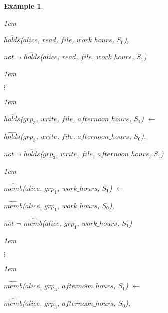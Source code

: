\documentclass[11pt]{report}
\newtheorem{vexample}{Example}[chapter]
\newenvironment{vquote}
{
  \begin{list}{}{\leftmargin 1em}\item[]
}
{
  \end{list}
}
\begin{document}
\begin{vexample}
\begin{enumerate}
\begin{vquote}
                \hspace{1em}
                $\hat{holds}$($alice$, $read$, $file$, $work\_hours$, $S_0$),

                \hspace{1em}
                $not$ $\lnot$ $\hat{holds}$($alice$, $read$, $file$, $work\_hours$, $S_1$)
              \end{vquote}

              \begin{vquote}
                \hspace{1em}
                $\vdots$
              \end{vquote}

              \begin{vquote}
                $\hat{holds}$($grp_3$, $write$, $file$, $afternoon\_hours$, $S_1$) $\leftarrow$

                \hspace{1em}
                $\hat{holds}$($grp_3$, $write$, $file$, $afternoon\_hours$, $S_0$),

                \hspace{1em}
                $not$ $\lnot$ $\hat{holds}$($grp_3$, $write$, $file$, $afternoon\_hours$, $S_1$)
              \end{vquote}

              \begin{vquote}
                $\hat{memb}$($alice$, $grp_1$, $work\_hours$, $S_1$) $\leftarrow$

                \hspace{1em}
                $\hat{memb}$($alice$, $grp_1$, $work\_hours$, $S_0$),

                \hspace{1em}
                $not$ $\lnot$ $\hat{memb}$($alice$, $grp_1$, $work\_hours$, $S_1$)
              \end{vquote}

              \begin{vquote}
                \hspace{1em}
                $\vdots$
              \end{vquote}

              \begin{vquote}
                $\hat{memb}$($alice$, $grp_3$, $afternoon\_hours$, $S_1$) $\leftarrow$

                \hspace{1em}
                $\hat{memb}$($alice$, $grp_3$, $afternoon\_hours$, $S_0$),


\end{vquote}
\end{enumerate}
\end{vexample}
\end{document}
